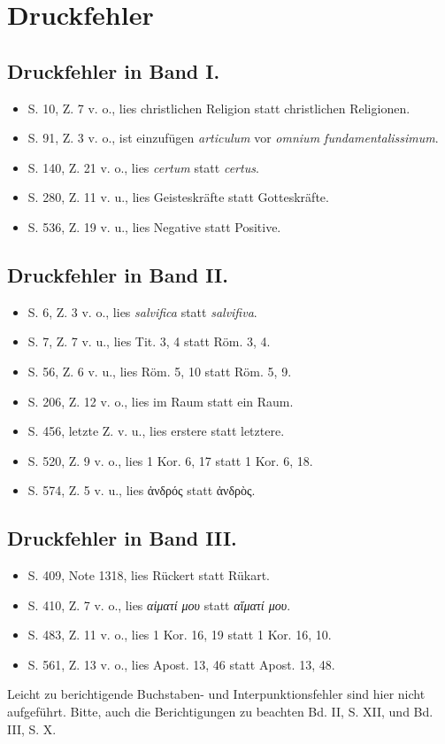\section*{Druckfehler}

\subsection*{Druckfehler in Band I.}
\begin{itemize}
    \item S. 10, Z. 7 v. o., lies christlichen Religion statt christlichen Religionen.
    \item S. 91, Z. 3 v. o., ist einzufügen \emph{articulum} vor \emph{omnium fundamentalissimum}.
    \item S. 140, Z. 21 v. o., lies \emph{certum} statt \emph{certus}.
    \item S. 280, Z. 11 v. u., lies Geisteskräfte statt Gotteskräfte.
    \item S. 536, Z. 19 v. u., lies Negative statt Positive.
\end{itemize}

\subsection*{Druckfehler in Band II.}
\begin{itemize}
    \item S. 6, Z. 3 v. o., lies \emph{salvifica} statt \emph{salvifiva}.
    \item S. 7, Z. 7 v. u., lies Tit. 3, 4 statt Röm. 3, 4.
    \item S. 56, Z. 6 v. u., lies Röm. 5, 10 statt Röm. 5, 9.
    \item S. 206, Z. 12 v. o., lies im Raum statt ein Raum.
    \item S. 456, letzte Z. v. u., lies erstere statt letztere.
    \item S. 520, Z. 9 v. o., lies 1 Kor. 6, 17 statt 1 Kor. 6, 18.
    \item S. 574, Z. 5 v. u., lies ἀνδρός statt ἀνδρὸς.
\end{itemize}

\subsection*{Druckfehler in Band III.}
\begin{itemize}
    \item S. 409, Note 1318, lies Rückert statt Rükart.
    \item S. 410, Z. 7 v. o., lies \emph{αἱματί μου} statt \emph{αἵματί μου}.
    \item S. 483, Z. 11 v. o., lies 1 Kor. 16, 19 statt 1 Kor. 16, 10.
    \item S. 561, Z. 13 v. o., lies Apost. 13, 46 statt Apost. 13, 48.
\end{itemize}

Leicht zu berichtigende Buchstaben- und Interpunktionsfehler sind hier nicht aufgeführt. Bitte, auch die Berichtigungen zu beachten Bd. II, S. XII, und Bd. III, S. X.